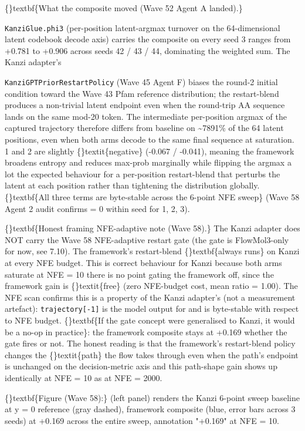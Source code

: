 \documentclass{article}
\begin{document}
\{\}textbf\{What the composite moved (Wave 52 Agent A landed).\}

\texttt{KanziGlue.phi3} (per-position latent-argmax turnover on the 64-dimensional latent codebook decode axis) carries the composite on every seed  3 ranges from +0.781 to +0.906 across seeds 42 / 43 / 44, dominating the weighted sum. The Kanzi adapter's

\texttt{KanziGPTPriorRestartPolicy} (Wave 45 Agent F) biases the round-2 initial condition toward the Wave 43 Pfam reference distribution; the restart-blend produces a non-trivial latent endpoint even when the round-trip AA sequence lands on the same mod-20 token. The intermediate per-position argmax of the captured trajectory therefore differs from baseline on \textasciitilde{}7891\% of the 64 latent positions, even when both arms decode to the same final sequence at saturation. 1 and 2 are slightly \{\}textit\{negative\} (-0.067 / -0.041), meaning the framework broadens entropy and reduces max-prob marginally while flipping the argmax a lot  the expected behaviour for a per-position restart-blend that perturbs the latent at each position rather than tightening the distribution globally. \{\}textbf\{All three  terms are byte-stable across the 6-point NFE sweep\} (Wave 58 Agent 2 audit confirms  = 0 within seed for 1, 2, 3).

\{\}textbf\{Honest framing  NFE-adaptive note (Wave 58).\} The Kanzi adapter does NOT carry the Wave 58 NFE-adaptive restart gate (the gate is FlowMol3-only for now, see 7.10). The framework's restart-blend \{\}textbf\{always runs\} on Kanzi at every NFE budget. This is correct behaviour for Kanzi because both arms saturate at NFE = 10  there is no point gating the framework off, since the framework gain is \{\}textit\{free\} (zero NFE-budget cost, mean ratio = 1.00). The NFE scan confirms this is a property of the Kanzi adapter's  (not a measurement artefact): \texttt{trajectory[-1]} is the model output for  and is byte-stable with respect to NFE budget. \{\}textbf\{If the gate concept were generalised to Kanzi, it would be a no-op in practice\}: the framework composite stays at +0.169 whether the gate fires or not. The honest reading is that the framework's restart-blend policy changes the \{\}textit\{path\} the flow takes through  even when the path's endpoint is unchanged on the decision-metric axis  and this path-shape gain shows up identically at NFE = 10 as at NFE = 2000.

\{\}textbf\{Figure (Wave 58):\}  (left panel) renders the Kanzi 6-point sweep  baseline at y = 0 reference (gray dashed), framework composite (blue, error bars across 3 seeds) at +0.169 across the entire sweep, annotation "+0.169" at NFE = 10.
\end{document}
